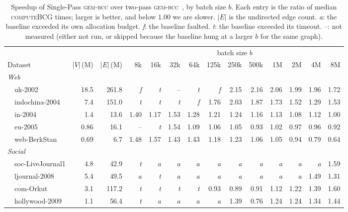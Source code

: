 \begin{table}[t]
\centering
\caption{Speedup of Single-Pass \textsc{gem-bcc} over two-pass
\textsc{gem-bcc}~\cite{europar25}, by batch size $b$. Each entry is the ratio
of median \textsc{computeBCG} times; larger is better, and below $1.00$ we are
slower. $|E|$ is the undirected edge count.
\emph{a}: the baseline exceeded its own allocation budget.
\emph{f}: the baseline faulted.
\emph{t}: the baseline exceeded its timeout.
--: not measured (either not run, or skipped because the baseline hung at a
larger $b$ for the same graph).}
\label{tab:speedup}
\small
\setlength{\tabcolsep}{4pt}
\begin{tabular}{lrrrrrrrrrrrrr}
\toprule
 & & & \multicolumn{11}{c}{batch size $b$} \\
\cmidrule(l){4-14}
Dataset & $|V|$\,(M) & $|E|$\,(M) & 8k & 16k & 32k & 64k & 125k & 250k & 500k & 1M & 2M & 4M & 8M \\
\midrule
\multicolumn{14}{l}{\emph{Web}} \\
~~uk-2002 & 18.5 & 261.8 & \emph{f} & \emph{t} & -- & \emph{t} & \emph{f} & 2.15 & 2.16 & 2.06 & 1.99 & 1.96 & 1.72 \\
~~indochina-2004 & 7.4 & 151.0 & \emph{t} & \emph{t} & \emph{t} & \emph{f} & 1.76 & 2.03 & 1.87 & 1.73 & 1.52 & 1.29 & 1.53 \\
~~in-2004 & 1.4 & 13.6 & 1.40 & 1.17 & 1.53 & 1.28 & 1.21 & 1.24 & 1.16 & 1.13 & 1.08 & 1.12 & 1.00 \\
~~eu-2005 & 0.86 & 16.1 & -- & \emph{t} & 1.54 & 1.09 & 1.06 & 1.05 & 0.93 & 1.02 & 0.97 & 0.96 & 0.92 \\
~~web-BerkStan & 0.69 & 6.7 & 1.48 & 1.57 & 1.43 & 1.43 & 1.18 & 1.23 & 1.06 & 1.05 & 0.94 & 0.79 & 0.64 \\
\multicolumn{14}{l}{\emph{Social}} \\
~~soc-LiveJournal1 & 4.8 & 42.9 & \emph{t} & \emph{a} & \emph{a} & \emph{a} & \emph{a} & \emph{a} & \emph{a} & \emph{a} & \emph{a} & \emph{a} & 1.59 \\
~~ljournal-2008 & 5.4 & 49.5 & \emph{a} & \emph{t} & \emph{a} & \emph{a} & \emph{a} & \emph{a} & \emph{a} & \emph{a} & \emph{a} & 1.49 & 1.31 \\
~~com-Orkut & 3.1 & 117.2 & \emph{t} & \emph{t} & \emph{t} & \emph{t} & 0.93 & 0.89 & 0.91 & 1.12 & 1.22 & 1.39 & 1.60 \\
~~hollywood-2009 & 1.1 & 56.4 & \emph{t} & \emph{a} & \emph{a} & \emph{a} & \emph{a} & 1.39 & 0.76 & 1.24 & 1.24 & 1.34 & 1.44 \\

\end{tabular}
\end{table}
